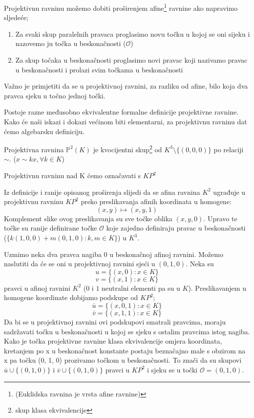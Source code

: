 \documentclass{mathos}
\begin{document}
Projektivnu ravninu možemo dobiti proširenjem afine\footnote{(Euklidska ravnina je vrsta afine ravnine)} ravnine ako napravimo sljedeće;
\begin{enumerate}
    \item Za svaki skup paralelnih pravaca proglasimo novu točku u kojoj se oni sijeku i nazovemo ju točka u beskonačnosti ($\mathcal{O}$)
    \item Za skup točaka u beskonačnosti proglasimo novi pravac koji nazivamo pravac u beskonačnosti i prolazi svim točkama u beskonačnosti
\end{enumerate}
Važno je primjetiti da se u projektivnoj ravnini, za razliku od afine, bilo koja dva pravca sjeku u točno jednoj točki.

Postoje razne međusobno ekvivalentne formalne definicije projektivne ravnine. Kako će naši iskazi i dokazi većinom biti elementarni, za projektivnu ravninu dat ćemo algebarsku definiciju.

\begin{defin}
    Projektivna ravnina $\mathbb{P}^2(K)$ je kvocijentni skup\footnote{skup klasa ekvivalencije} od $K^3\setminus\{(0, 0, 0)\}$ po relaciji $\sim$. ($x \sim kx, \forall k \in K$)
\end{defin}
\begin{nap}
    Projektivnu ravninu nad K ćemo označavati s $KP^2$
\end{nap}

Iz definicije i ranije opisanog proširenja slijedi da se afina ravnina $K^2$ ugrađuje u projektivnu ravninu $KP^2$ preko preslikavanja afinih koordinata u homogene:
\[ (x, y) \mapsto (x, y, 1) \]
Komplement slike ovog preslikavanja su sve točke oblika $(x, y, 0)$. Upravo te točke su ranije definirane točke $\mathcal{O}$ koje zajedno definiraju pravac u beskonačnosti ($\{k(1, 0, 0) + m(0, 1, 0): k,m\in K\}$) u $K^3$.

\begin{primjer}
    Uzmimo neka dva pravca nagiba 0 u beskonačnoj afinoj ravnini. Možemo naslutiti da će se oni u projektivnoj ravnini sjeći u $(0, 1, 0)$. Neka su
    \[ u = \{(x, 0): x \in K\} \]
    \[ v = \{(x, 1): x \in K\} \]
    pravci u afinoj ravnini $K^2$ ($0$ i $1$ neutralni elementi pa su u $K$).
    Preslikavanjem u homogene koordinate dobijamo podskupe od $KP^2$;
    \[ \overset{\_}{u} = \{(x, 0, 1): x \in K\} \]
    \[ \overset{\_}{v} = \{(x, 1, 1): x \in K\} \]
    Da bi se u projektivnoj ravnini ovi podskupovi smatrali pravcima, moraju sadržavati točku u beskonačnosti u kojoj se sjeku s ostalim pravcima istog nagiba. Kako je točka projektivne ravnine klasa ekvivalencije omjera koordinata, kretanjem po x u beskonačnost konstante postaju beznačajno male s obzirom na x pa točku (0, 1, 0) prozivamo točkom u beskonačnosti. To znači da su skupovi $\overset{\_}{u} \cup \{(0, 1, 0)\}$ i $\overset{\_}{v} \cup \{(0, 1, 0)\}$ pravci u $KP^2$ i sjeku se u točki $\mathcal{O} = (0, 1, 0)$.
\end{primjer}
\end{document}
